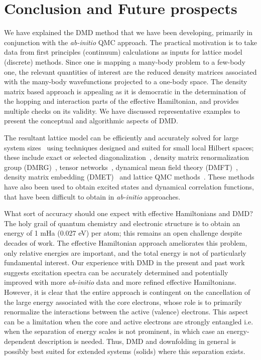 \section{Conclusion and Future prospects}
We have explained the DMD method that we have been developing, primarily in conjunction with the 
\textit{ab-initio} QMC approach. The practical motivation is to take data from first principles (continuum) 
calculations as inputs for lattice model (discrete) methods. 
Since one is mapping a many-body problem to a few-body one, the relevant quantities of interest are 
the reduced density matrices associated with the many-body wavefunctions projected to a one-body space. 
The density matrix based approach is appealing as it is democratic 
in the determination of the hopping and interaction parts of the effective Hamiltonian, and provides multiple 
checks on its validity. We have discussed representative examples to present the conceptual and algorithmic aspects of DMD. 

The resultant lattice model can be efficiently and accurately solved for large system sizes~\cite{LeBlanc_PRX} 
using techniques designed and suited for small local Hilbert spaces; these include exact or 
selected diagonalization~\cite{DeRaedt,Tubman_selci,Holmes_Tubman_Umrigar}, 
density matrix renormalization group (DMRG)~\cite{White1992}, tensor networks~\cite{PEPS,Changlani_CPS,NeuscammanCPS}, 
dynamical mean field theory (DMFT)~\cite{Kotliar2006}, density matrix embedding (DMET)~\cite{DMET_2012} and 
lattice QMC methods~\cite{Scalapino, Trivedi_Ceperley, Zhang_AFQMC, Sandvik_loops, Prokofiev, 
Booth2009,SQMC,Holmes_Changlani_Umrigar, Booth2013}. These methods have also been used to obtain excited states 
and dynamical correlation functions, that have been difficult to obtain in \textit{ab-initio} approaches. 

What sort of accuracy should one expect with effective Hamiltonians and DMD? The holy grail of quantum chemistry 
and electronic structure is to obtain an energy of 1 mHa (0.027 eV) per atom; this 
remains an open challenge despite decades of work. The effective Hamiltonian approach 
ameliorates this problem, only relative energies are important, and 
the total energy is not of particularly fundamental interest. Our experience with DMD in the present and past work~\cite{Changlani2015} 
suggests excitation spectra can be accurately determined and potentially improved with more \textit{ab-initio} data 
and more refined effective Hamiltonians. However, it is clear that the entire approach is contingent on the 
cancellation of the large energy associated with the core electrons, 
whose role is to primarily renormalize the interactions between the active (valence) electrons. 
This aspect can be a limitation when the core and active electrons are strongly entangled i.e. 
when the separation of energy scales is not prominent, in which case an energy-dependent description is needed. 
Thus, DMD and downfolding in general is possibly best suited for extended systems (solids) where this separation exists. 

